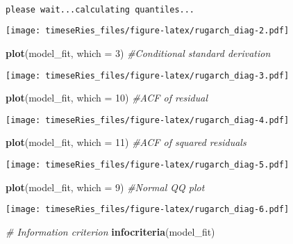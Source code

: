 \documentclass[]{book}
\newenvironment{Shaded}{\begin{snugshade}}{\end{snugshade}}
\newcommand{\CommentTok}[1]{\textcolor[rgb]{0.56,0.35,0.01}{\textit{#1}}}
\newcommand{\DataTypeTok}[1]{\textcolor[rgb]{0.13,0.29,0.53}{#1}}
\newcommand{\DecValTok}[1]{\textcolor[rgb]{0.00,0.00,0.81}{#1}}
\newcommand{\KeywordTok}[1]{\textcolor[rgb]{0.13,0.29,0.53}{\textbf{#1}}}
\newcommand{\NormalTok}[1]{#1}
\begin{document}
\begin{verbatim}

please wait...calculating quantiles...
\end{verbatim}

\texttt{[image: timeseRies\_files/figure-latex/rugarch\_diag-2.pdf]}

\begin{Shaded}
\begin{Highlighting}[]
\KeywordTok{plot}\NormalTok{(model_fit, }\DataTypeTok{which =} \DecValTok{3}\NormalTok{)  }\CommentTok{#Conditional standard derivation}
\end{Highlighting}
\end{Shaded}

\texttt{[image: timeseRies\_files/figure-latex/rugarch\_diag-3.pdf]}

\begin{Shaded}
\begin{Highlighting}[]
\KeywordTok{plot}\NormalTok{(model_fit, }\DataTypeTok{which =} \DecValTok{10}\NormalTok{)  }\CommentTok{#ACF of residual}
\end{Highlighting}
\end{Shaded}

\texttt{[image: timeseRies\_files/figure-latex/rugarch\_diag-4.pdf]}

\begin{Shaded}
\begin{Highlighting}[]
\KeywordTok{plot}\NormalTok{(model_fit, }\DataTypeTok{which =} \DecValTok{11}\NormalTok{)  }\CommentTok{#ACF of squared residuals}
\end{Highlighting}
\end{Shaded}

\texttt{[image: timeseRies\_files/figure-latex/rugarch\_diag-5.pdf]}

\begin{Shaded}
\begin{Highlighting}[]
\KeywordTok{plot}\NormalTok{(model_fit, }\DataTypeTok{which =} \DecValTok{9}\NormalTok{)  }\CommentTok{#Normal QQ plot}
\end{Highlighting}
\end{Shaded}

\texttt{[image: timeseRies\_files/figure-latex/rugarch\_diag-6.pdf]}

\begin{Shaded}
\begin{Highlighting}[]
\CommentTok{# Information criterion}
\KeywordTok{infocriteria}\NormalTok{(model_fit)}
\end{Highlighting}
\end{Shaded}
\end{document}
